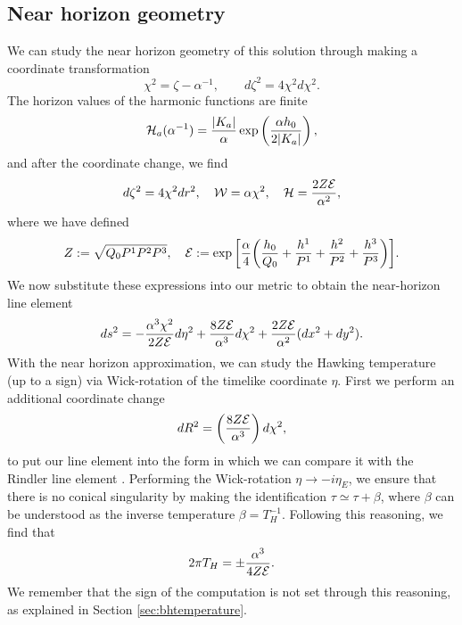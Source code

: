 \subsection{Near horizon geometry}

We can study the near horizon geometry of this solution through making a coordinate transformation
\begin{equation}
\label{eq:nhcc}
    \chi^2 = \zeta - \alpha^{-1}, \qquad d\zeta^2 = 4 \chi^2 d\chi^2 .
\end{equation}
The horizon values of the harmonic functions are finite
\begin{equation*}
  {\cal H}_a(\alpha^{-1}) = \frac{|K_a|}{\alpha} \exp\left(\frac{\alpha h_0}{2 |K_a|} \right) ,
\end{equation*}
and after the coordinate change, we find
\begin{equation*}
  d\zeta^2 = 4\chi^2 dr^2, \quad {\cal W} = \alpha \chi^{2}, \quad {\cal H} = \frac{2Z {\cal E}}{\alpha^2},
\end{equation*}
where we have defined
\begin{equation*}
  Z := \sqrt{Q_0P^1P^2P^3}, \quad {\cal E} := \exp \bigg[\frac{\alpha}{4} \bigg(\frac{h_0}{Q_0} + \frac{h^1}{P^1} + \frac{h^2}{P^2} + \frac{h^3}{P^3} \bigg) \bigg].
\end{equation*}
We now substitute these expressions into our metric to obtain the near-horizon line element
\begin{equation}
\label{eq:nearhorizon}
ds^2 = -\frac{\alpha^3 \chi^2}{2 Z {\cal E}} d\eta^2 + \frac{8 Z {\cal E}}{\alpha^3} d\chi^2 + \frac{2 Z {\cal E}}{\alpha^2} (dx^2 + dy^2).
\end{equation}
With the near horizon approximation, we can study the Hawking temperature (up to a sign) via Wick-rotation of the timelike coordinate $\eta$. First we perform an additional coordinate change
\begin{equation*}
  dR^2 = \left(\frac{8 Z {\cal E}}{\alpha^{3}} \right) d\chi^2,
\end{equation*}
to put our line element into the form in which we can compare it with the Rindler line element \cite{Wald:106274}. Performing the Wick-rotation $\eta \rightarrow -i \eta_E$, we ensure that there is no conical singularity by making the identification $\tau \simeq \tau + \beta$, where $\beta$ can be understood as the inverse temperature $\beta = T_H^{-1}$. Following this reasoning, we find that
\begin{equation}
\label{eq:nearhorizontemp}
    2\pi T_H = \pm \frac{\alpha^3}{4 Z {\cal E}}.
 \end{equation}
We remember that the sign of the computation is not set through this reasoning, as explained in Section \ref{sec:bhtemperature}. 


